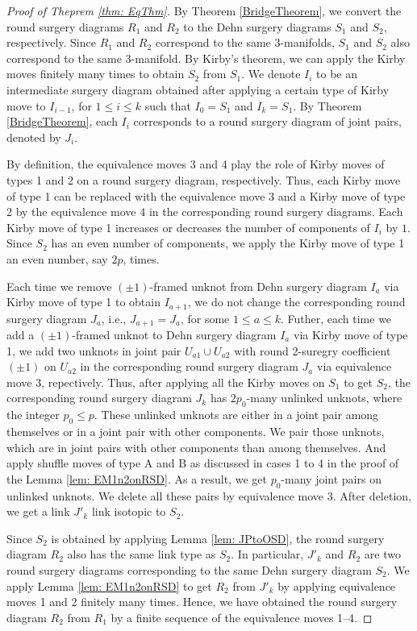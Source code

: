 \documentclass{amsart}
\theoremstyle{plain}
\theoremstyle{remark}
\theoremstyle{definition}
\begin{document}
\begin{proof}[Proof of Theprem \ref{thm: EqThm}]
By Theorem \ref{BridgeTheorem}, we convert the round surgery diagrams $R_1$ and $R_2$ to the Dehn surgery diagrams $S_1$ and $S_2$, respectively. 
Since $R_1$ and $R_2$ correspond to the same 3-manifolds, $S_1$ and $S_2$ also correspond to the same 3-manifold. 
By Kirby's theorem, we can apply the Kirby moves finitely many times to obtain $S_2$ from $S_1$.
We denote $I_{i}$ to be an intermediate surgery diagram obtained after applying a certain type of Kirby move to $I_{i-1}$, for $1\leq i\leq k$ such that $I_0=S_1$ and $I_k=S_1$. 
By Theorem \ref{BridgeTheorem}, each $I_i$ corresponds to a round surgery diagram of joint pairs, denoted by $J_i$. %

By definition, the equivalence moves 3 and 4 play the role of Kirby moves of types 1 and 2 on a round surgery diagram, respectively.
Thus, each Kirby move of type 1 can be replaced with the equivalence move 3 and a Kirby move of type 2 by the equivalence move 4 in the corresponding round surgery diagrams.
Each Kirby move of type 1 increases or decreases the number of components of $I_i$ by $1$. 
Since $S_2$ has an even number of components, we apply the Kirby move of type 1 an even number, say $2p$, times. 

Each time we remove $(\pm1)$-framed unknot from Dehn surgery diagram $I_a$ via Kirby move of type 1 to obtain $I_{a+1}$, we do not change the corresponding round surgery diagram $J_a$, i.e., $J_{a+1}= J_a$, for some $1\leq a \leq k$. 
Futher, each time we add a $(\pm1)$-framed unknot to Dehn surgery diagram $I_a$ via Kirby move of type 1, we add two unknots in joint pair $U_{a1} \cup U_{a2}$ with round 2-suregry coefficient $(\pm1)$ on $U_{a2}$ in the corresponding round surgery diagram $J_a$ via equivalence move 3, repectively. 
Thus, after applying all the Kirby moves on $S_1$ to get $S_2$, the corresponding round surgery diagram $J_k$ has $2p_0$-many unlinked unknots, where the integer $p_0 \leq p$. 
These unlinked unknots are either in a joint pair among themselves or in a joint pair with other components. 
We pair those unknots, which are in joint pairs with other components than among themselves.
And apply shuffle moves of type A and B as discussed in  
cases 1 to 4 in the proof of the Lemma \ref{lem: EM1n2onRSD}.
As a result, we get $p_0$-many joint pairs on unlinked unknots. 
We delete all these pairs by equivalence move 3. 
After deletion, we get a link $J'_k$ link isotopic to $S_2$. 

Since $S_2$ is obtained by applying Lemma \ref{lem: JPtoOSD}, the round surgery diagram $R_2$ also has the same link type as $S_2$.
In particular, $J'_k$ and $R_2$ are two round surgery diagrams corresponding to the same Dehn surgery diagram $S_2$.
We apply Lemma \ref{lem: EM1n2onRSD} to get $R_2$ from $J'_k$ by applying equivalence moves 1 and 2 finitely many times.
Hence, we have obtained the round surgery diagram $R_2$ from $R_1$ by a finite sequence of the equivalence moves 1--4. 
\end{proof}
\end{document}
